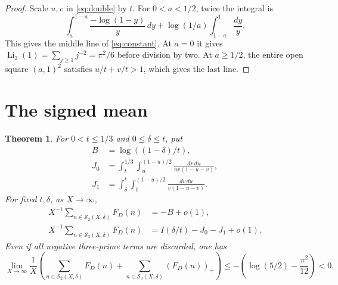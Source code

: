 \documentclass[11pt]{article}
\newcommand{\LiTwo}{\operatorname{Li}_2}
\newcommand{\pos}[1]{(#1)_{+}}
\newtheorem{theorem}{Theorem}
\begin{document}
\begin{proof}
Scale \(u,v\) in \eqref{eq:double} by \(t\). For \(0<a<1/2\),
twice the integral is
\[
 \int_a^{1-a}\frac{-\log(1-y)}{y}\,dy
  +\log(1/a)\int_{1-a}^1\frac{dy}{y}.
\]
This gives the middle line of \eqref{eq:constant}. At \(a=0\)
it gives \(\LiTwo(1)=\sum_{j\ge1}j^{-2}=\pi^2/6\) before division
by two. At \(a\ge1/2\), the entire open square \((a,1)^2\)
satisfies \(u/t+v/t>1\), which gives the last line.
\end{proof}

\section{The signed mean}

\begin{theorem}\label{thm:signed}
For \(0<t\le 1/3\) and \(0\le\delta\le t\), put
\begin{align}
 B&=\log((1-\delta)/t),\nonumber\\
 J_0&=\int_t^{1/3}\int_u^{(1-u)/2}
                    \frac{dv\,du}{uv(1-u-v)},\label{eq:Js}\\
 J_1&=\int_\delta^t\int_t^{(1-u)/2}
                    \frac{dv\,du}{v(1-u-v)}.\nonumber
\end{align}
For fixed \(t,\delta\), as \(X\to\infty\),
\begin{align*}
 X^{-1}\!\sum_{n\in\mathcal S_2(X,\delta)}F_D(n)&=-B+o(1),\\
 X^{-1}\!\sum_{n\in\mathcal S_3(X,\delta)}F_D(n)
         &=I(\delta/t)-J_0-J_1+o(1).
\end{align*}
Even if all negative three-prime terms are discarded, one has
\[
 \lim_{X\to\infty}\frac1X\left(
   \sum_{n\in\mathcal S_2(X,\delta)}F_D(n)+
   \sum_{n\in\mathcal S_3(X,\delta)}\pos{F_D(n)}\right)
 \le -\left(\log(5/2)-\frac{\pi^2}{12}\right)<0.
\]
\end{theorem}
\end{document}
